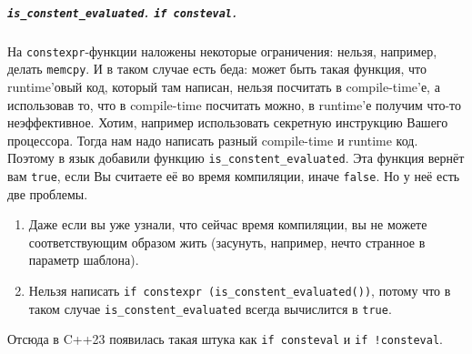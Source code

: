 \documentclass{article}
\begin{document}
    \subparagraph{\texttt{is_constent_evaluated}. \texttt{if consteval}.}
    На \texttt{constexpr}-функции наложены некоторые ограничения: нельзя, например, делать \texttt{memcpy}. И в таком случае есть беда: может быть такая функция, что runtime'овый код, который там написан, нельзя посчитать в compile-time'е, а использовав то, что в compile-time посчитать можно, в runtime'е получим что-то неэффективное. Хотим, например использовать секретную инструкцию Вашего процессора. Тогда нам надо написать разный compile-time и runtime код.\\
    Поэтому в язык добавили функцию \texttt{is_constent_evaluated}. Эта функция вернёт вам \texttt{true}, если Вы считаете её во время компиляции, иначе \texttt{false}. Но у неё есть две проблемы.
    \begin{enumerate}
        \item Даже если вы уже узнали, что сейчас время компиляции, вы не можете соответствующим образом жить (засунуть, например, нечто странное в параметр шаблона).
        \item Нельзя написать \texttt{if constexpr (is_constent_evaluated())}, потому что в таком случае \texttt{is_constent_evaluated} всегда вычислится в \texttt{true}.
    \end{enumerate}
    Отсюда в C++23 появилась такая штука как \texttt{if consteval} и \texttt{if !consteval}.
\end{document}
